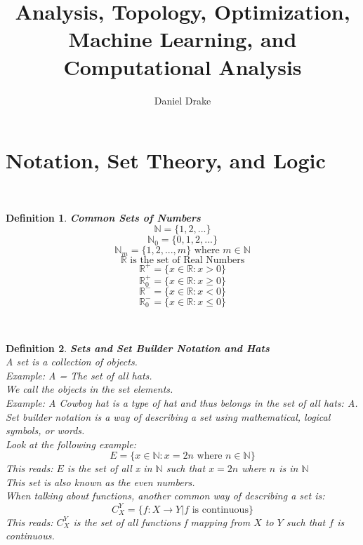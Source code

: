 \documentclass[12pt]{extarticle}
\title{Analysis, Topology, Optimization, Machine Learning, and Computational Analysis}
\author{Daniel Drake}
\theoremstyle{plain}
\theoremstyle{plain}
\theoremstyle{plain}
\theoremstyle{Definition}
\newtheorem{def.}{Definition}[section]
\theoremstyle{Definition}
\theoremstyle{plain}
\newcommand{\cut}[0]{\noindent\framebox[\linewidth]{\rule{\linewidth}{2pt}}\\}
\begin{document}
\maketitle			
\section{Notation, Set Theory, and Logic}
\cut
\begin{def.} \textbf{Common Sets of Numbers} \\ 
	$$\mathbb{N} = \{1,2,...\}$$	
	$$\mathbb{N}_0 = \{0,1,2,...\}$$
	$$\mathbb{N}_m = \{1,2,...,m\} \text{ where } m \in \mathbb{N}$$
	$$\mathbb{R} \text{ is the set of Real Numbers}$$
	$$\mathbb{R}^+ = \{x \in \mathbb{R} : x > 0\}$$
	$$\mathbb{R}_0^+ = \{x \in \mathbb{R} : x \geq 0\}$$
	$$\mathbb{R}^- = \{x \in \mathbb{R} : x < 0\}$$
	$$\mathbb{R}_0^- = \{x \in \mathbb{R} : x \leq 0\}$$
\end{def.}
\cut
\begin{def.} \textbf{Sets and Set Builder Notation and Hats} \\ 
	A set is a collection of objects. \\ 
	Example: A = The set of all hats. \\ 
	We call the objects in the set elements. \\ 
	Example: A Cowboy hat is a type of hat and thus belongs in the set of all hats: A. \\
	
	Set builder notation is a way of describing a set using mathematical, logical symbols, or words. \\
	Look at the following example: \\ 
	$$E = \{x \in \mathbb{N}: x = 2n \text{ where } n \in \mathbb{N}\}$$
	This reads: $E$ is the set of all x in $\mathbb{N}$ such that $x = 2n$ where $n$ is in $\mathbb{N}$ \\
	This set is also known as the even numbers. \\
	When talking about functions, another common way of describing a set is: 
	$$C_X^Y = \{f : X \to Y | f \text{ is continuous} \}$$
	This reads: $C_X^Y$ is the set of all functions f mapping from $X$ to $Y$ such that $f$ is continuous. 
\end{def.}
\cut
\end{document}
